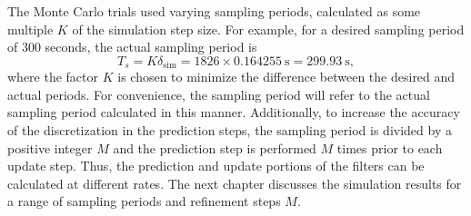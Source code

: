 \documentclass[../zhang_thesis.tex]{subfiles}
\begin{document}
The Monte Carlo trials used varying sampling periods, calculated as some multiple $K$ of the simulation step size. For example, for a desired sampling period of 300 seconds, the actual sampling period is
\begin{equation}
    T_s = K \delta_\text{sim} = 1826 \times 0.164255~\text{s} = 299.93~\text{s},
\end{equation}
where the factor $K$ is chosen to minimize the difference between the desired and actual periods. For convenience, the sampling period will refer to the actual sampling period calculated in this manner. Additionally, to increase the accuracy of the discretization in the prediction steps, the sampling period is divided by a positive integer $M$ and the prediction step is performed $M$ times prior to each update step. Thus, the prediction and update portions of the filters can be calculated at different rates. The next chapter discusses the simulation results for a range of sampling periods
and refinement steps $M$.




%

%
\end{document}
